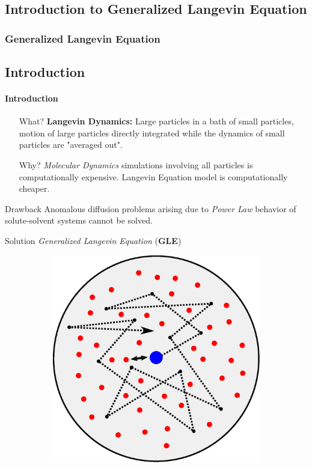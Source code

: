 \documentclass[a4paper,10pt]{beamer}
\begin{document}
	\begin{frame}
		\small
		\section{Introduction to Generalized Langevin Equation}
		\frametitle{Generalized Langevin Equation}
		\subsection{Introduction}
		\framesubtitle{Introduction}
		\begin{itemize}
			\item[What?] {\textbf{Langevin Dynamics:} Large particles in a bath of small particles, motion of large particles directly integrated while the dynamics of small particles are "averaged out".}
			\item[Why?] {\textit{Molecular Dynamics} simulations involving all particles is computationally expensive. Langevin Equation model is computationally cheaper.}
		\end{itemize}
		\begin{minipage}{0.35\linewidth}
			\footnotesize
			\begin{alertblock}{Drawback}
				Anomalous diffusion problems arising due to \textit{Power Law} behavior of solute-solvent systems cannot be solved.
			\end{alertblock}
			\begin{exampleblock}{Solution}
				\textit{Generalized Langevin Equation} (\textbf{GLE})
			\end{exampleblock}
		\end{minipage}
		\hfill
		\begin{minipage}{0.6\linewidth}
			\centering
			\begin{figure}[H]
				\begin{subfigure}[b]{0.45\linewidth}
					\includegraphics[width=\linewidth]{./Plots/HeatBath.eps}

\end{subfigure}
\end{figure}
\end{minipage}
\end{frame}
\end{document}
